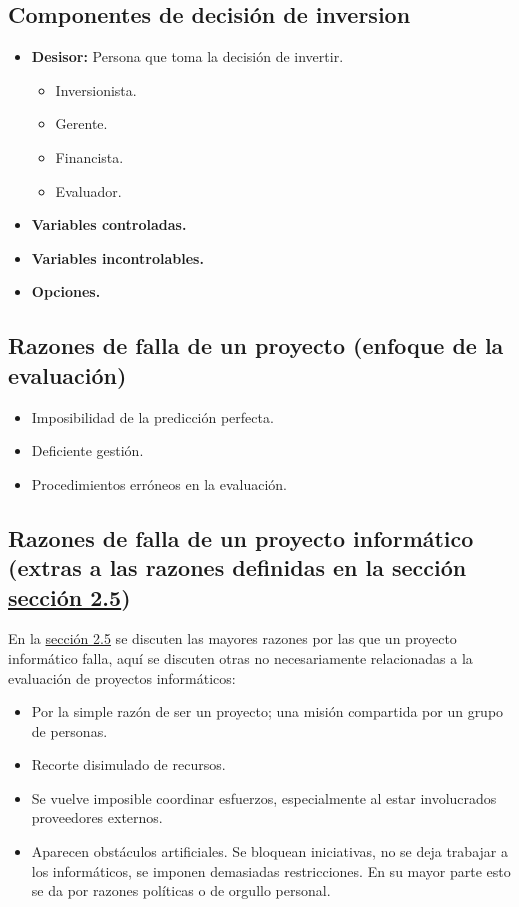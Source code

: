 \documentclass{templateNote}
\begin{document}
\subsection{Componentes de decisión de inversion}
\begin{itemize}
    \item \textbf{Desisor:} Persona que toma la decisión de invertir.
    \begin{itemize}
        \item Inversionista.
        \item Gerente.
        \item Financista.
        \item Evaluador.
    \end{itemize}
    \item \textbf{Variables controladas.}
    \item \textbf{Variables incontrolables.}
    \item \textbf{Opciones.}
\end{itemize}

\subsection{Razones de falla de un proyecto (enfoque de la evaluación)}
\begin{itemize}
    \item Imposibilidad de la predicción perfecta.
    \item Deficiente gestión.
    \item Procedimientos erróneos en la evaluación.
\end{itemize}

\subsection{Razones de falla de un proyecto informático (extras a las razones definidas en la sección \hyperref[sec:razones-falla]{sección 2.5})}
En la \hyperref[sec:razones-falla]{sección 2.5} se discuten las mayores razones por las que un proyecto informático falla, aquí se discuten otras no necesariamente relacionadas a la evaluación de proyectos informáticos:
\begin{itemize}
    \item Por la simple razón de ser un proyecto; una misión compartida por un grupo de personas.
    \item Recorte disimulado de recursos.
    \item Se vuelve imposible coordinar esfuerzos, especialmente al estar involucrados proveedores externos.
    \item Aparecen obstáculos artificiales. Se bloquean iniciativas, no se deja trabajar a los informáticos, se imponen demasiadas restricciones. En su mayor parte esto se da por razones políticas o de orgullo personal.
\end{itemize}
\end{document}
